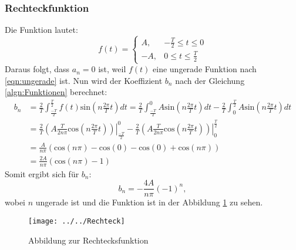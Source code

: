 \subsubsection{Rechteckfunktion}
Die Funktion lautet:
\begin{equation*}
f(t) =
\begin{cases}
A, & -\frac{T}{2} \le t \le 0 \\
-A, & 0 \le t \le \frac{T}{2}
\end{cases}
\end{equation*}
Daraus folgt, dass $a_{n} = 0$ ist, weil $f(t)$ eine ungerade Funktion nach \ref{eqn:ungerade} ist. Nun wird der Koeffizient $b_n$ nach der Gleichung \ref{algn:Funktionen} berechnet:
\begin{align*}
b_{n} &= \frac{2}{T} \int_{\frac{-T}{2}}^{\frac{T}{2}} f(t) \text{sin}\left(n \frac{2\pi}{T} t \right) dt = \frac{2}{T} \int_{\frac{-T}{2}}^{0} A\text{sin}\left(n \frac{2\pi}{T} t \right) dt - \frac{2}{T} \int_{0}^{\frac{T}{2}} A \text{sin}\left(n \frac{2\pi}{T} t \right) dt \\
&= \frac{2}{T} \left.\left(A\frac{T}{2n\pi}\text{cos}\left(n\frac{2\pi}{T}t\right)\right)\right|_{\frac{-T}{2}}^{0} - \frac{2}{T}\left.\left(A \frac{T}{2n\pi}\text{cos}\left(n\frac{2\pi}{T}t\right)\right)\right|_{0}^{\frac{T}{2}} \\  
&= \frac{A}{n\pi}\left(\text{cos}(n\pi)-\text{cos}(0)-\text{cos}(0)+\text{cos}(n\pi)\right) \\
&= \frac{2A}{n\pi}\left(\text{cos}(n\pi)-1\right)
\end{align*}
Somit ergibt sich für $b_{n}$:
\begin{equation}
b_{n} = -\frac{4A}{n\pi}(-1)^{n},
\end{equation}
wobei $n$ ungerade ist und die Funktion ist in der Abbildung \ref{fig:rechteck} zu sehen.
\begin{figure}[htb]
	\centering
	\texttt{[image: ../../Rechteck]}
	\caption{Abbildung zur Rechtecksfunktion}
	\label{fig:rechteck}
\end{figure}
